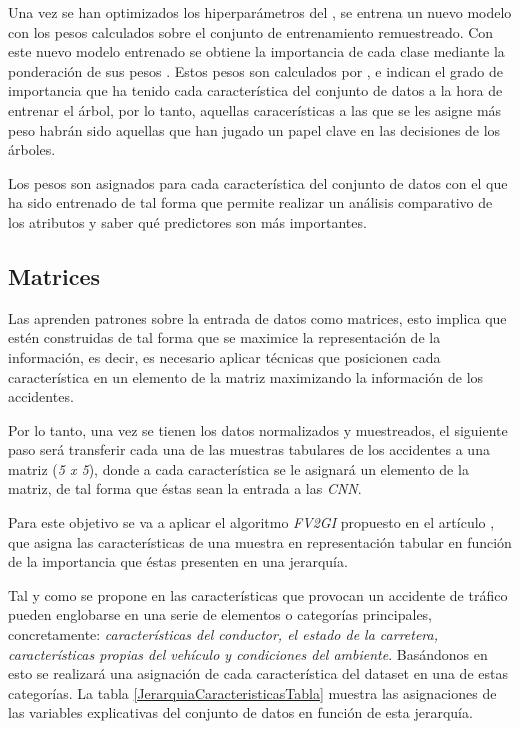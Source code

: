         Una vez se han optimizados los hiperparámetros del , se entrena un nuevo modelo con los pesos calculados sobre el conjunto de entrenamiento remuestreado. Con este nuevo modelo  entrenado se obtiene la importancia de cada clase mediante la ponderación de sus pesos \cite{XGBoostFeatureWeightsMeaning}. Estos pesos son calculados por , e indican el grado de importancia que ha tenido cada característica del conjunto de datos a la hora de entrenar el árbol, por lo tanto, aquellas caracerísticas a las que se les asigne más peso habrán sido aquellas que han jugado un papel clave en las decisiones de los árboles.

        Los pesos son asignados para cada característica del conjunto de datos con el que ha sido entrenado  de tal forma que permite realizar un análisis comparativo de los atributos y saber qué predictores son más importantes.


    \subsection{Matrices}


        Las  aprenden patrones sobre la entrada de datos como matrices, esto implica que estén construidas de tal forma que se maximice la representación de la información, es decir, es necesario aplicar técnicas que posicionen cada característica en un elemento de la matriz maximizando la información de los accidentes.

        Por lo tanto, una vez se tienen los datos normalizados y muestreados, el siguiente paso será transferir cada una de las muestras tabulares de los accidentes a una matriz (\textit{5 x 5}), donde a cada característica se le asignará un elemento de la matriz, de tal forma que éstas sean la entrada a las \textit{CNN}.

        Para este objetivo se va a aplicar el algoritmo \textit{FV2GI} propuesto en el artículo \cite{TASPCNN}, que asigna las características de una muestra en representación tabular en función de la importancia que éstas presenten en una jerarquía.

        Tal y como se propone en \cite{JerarquiaImagenes} las características que provocan un accidente de tráfico pueden englobarse en una serie de elementos o categorías principales, concretamente: \textit{características del conductor, el estado de la carretera, características propias del vehículo y condiciones del ambiente}. Basándonos en esto se realizará una asignación de cada característica del dataset en una de estas categorías. La tabla \ref{JerarquiaCaracteristicasTabla} muestra las asignaciones de las variables explicativas del conjunto de datos en función de esta jerarquía.


